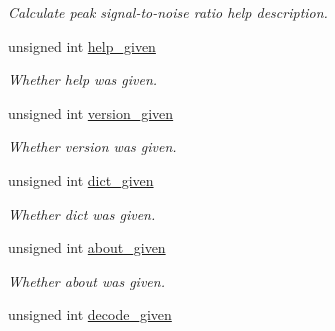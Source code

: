 \begin{DoxyCompactItemize}
\begin{DoxyCompactList}\small\item\em Calculate peak signal-\/to-\/noise ratio help description. \end{DoxyCompactList}\item 
\hypertarget{structgengetopt__args__info_ab9fd677f890731fd7d6f6c62e6dfc99c}{}unsigned int \hyperlink{structgengetopt__args__info_ab9fd677f890731fd7d6f6c62e6dfc99c}{help\+\_\+given}\label{structgengetopt__args__info_ab9fd677f890731fd7d6f6c62e6dfc99c}

\begin{DoxyCompactList}\small\item\em Whether help was given. \end{DoxyCompactList}\item 
\hypertarget{structgengetopt__args__info_ad4953a2130b2f8b94a3a687014f278e1}{}unsigned int \hyperlink{structgengetopt__args__info_ad4953a2130b2f8b94a3a687014f278e1}{version\+\_\+given}\label{structgengetopt__args__info_ad4953a2130b2f8b94a3a687014f278e1}

\begin{DoxyCompactList}\small\item\em Whether version was given. \end{DoxyCompactList}\item 
\hypertarget{structgengetopt__args__info_a2137b690a3a685f8c373ca1f2b75a852}{}unsigned int \hyperlink{structgengetopt__args__info_a2137b690a3a685f8c373ca1f2b75a852}{dict\+\_\+given}\label{structgengetopt__args__info_a2137b690a3a685f8c373ca1f2b75a852}

\begin{DoxyCompactList}\small\item\em Whether dict was given. \end{DoxyCompactList}\item 
\hypertarget{structgengetopt__args__info_ae234513d2c83ee0706ed4e3ccd8bedf1}{}unsigned int \hyperlink{structgengetopt__args__info_ae234513d2c83ee0706ed4e3ccd8bedf1}{about\+\_\+given}\label{structgengetopt__args__info_ae234513d2c83ee0706ed4e3ccd8bedf1}

\begin{DoxyCompactList}\small\item\em Whether about was given. \end{DoxyCompactList}\item 
\hypertarget{structgengetopt__args__info_a81e6fb4452d3d35d3d7c7c2756da1758}{}unsigned int \hyperlink{structgengetopt__args__info_a81e6fb4452d3d35d3d7c7c2756da1758}{decode\+\_\+given}\label{structgengetopt__args__info_a81e6fb4452d3d35d3d7c7c2756da1758}


\end{DoxyCompactItemize}
